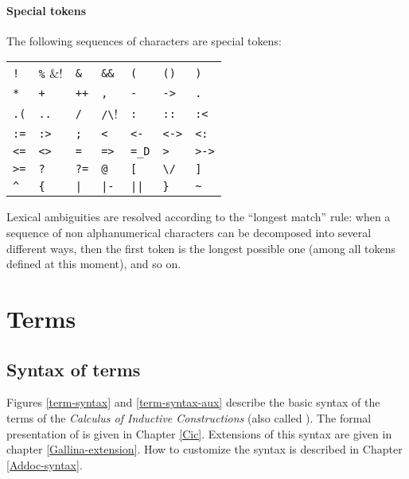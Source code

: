 \paragraph{Special tokens}
The following sequences of characters are special tokens:
\begin{center}
\begin{tabular}{lllllll}
\verb/!/   &
\verb!%!  &
\verb!&!   &
\verb!&&!  &
\verb!(!   &
\verb!()!  &
\verb!)!   \\
%
\verb!*!   &
\verb!+!   &
\verb!++!  &
\verb!,!   &
\verb!-!   &
\verb!->!  &
\verb!.!   \\
%
\verb!.(!  &
\verb!..!  &
\verb!/!   &
\verb!/\!  &
\verb!:!   &
\verb!::!  &
\verb!:<!  \\
%
\verb!:=!  &
\verb!:>!  &
\verb!;!   &
\verb!<!   &
\verb!<-!  &
\verb!<->! &
\verb!<:!  \\
%
\verb!<=!  &
\verb!<>!  &
\verb!=!   &
\verb!=>!  &
\verb!=_D! &
\verb!>!   &
\verb!>->! \\
%
\verb!>=!  &
\verb!?!   &
\verb!?=!  &
\verb!@!   &
\verb![!   &
\verb!\/!  &
\verb!]!   \\
%
\verb!^!   &
\verb!{!   &
\verb!|!   &
\verb!|-!  &
\verb!||!  &
\verb!}!   &
\verb!~!   \\
\end{tabular}
\end{center}

Lexical ambiguities are resolved according to the ``longest match''
rule: when a sequence of non alphanumerical characters can be decomposed
into several different ways, then the first token is the longest
possible one (among all tokens defined at this moment), and so on.

\section{Terms \label{term}}

\subsection{Syntax of terms}

Figures \ref{term-syntax} and \ref{term-syntax-aux} describe the basic syntax of
the terms of the {\em Calculus of Inductive Constructions} (also
called \CIC). The formal presentation of {\CIC} is given in Chapter
\ref{Cic}. Extensions of this syntax are given in chapter
\ref{Gallina-extension}. How to customize the syntax is described in Chapter
\ref{Addoc-syntax}.

